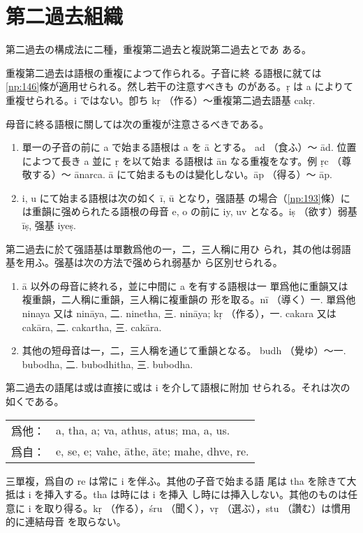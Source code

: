 \section{第二過去組織}
第二過去の構成法に二種，重複第二過去と複説第二過去とであ
ある。

\numberParagraph \label{np:192}
重複第二過去は語根の重複によつて作られる。子音に終
る語根に就ては \ref{np:146}條が適用せられる。然し若干の注意すべきも
のがある。ṛ は a によりて重複せられる。i ではない。卽ち kṛ
（作る）～重複第二過去語基 cakṛ.

母音に終る語根に關しては次の重複が注意さるべきである。
\begin{enumerate}[label=(\alph*)]
\item 單一の子音の前に a で始まる語根は a を ā とする。
ad （食ふ）～ ād. 位置によつて長き a 並に ṛ を以て始ま
る語根は ān なる重複をなす。例 ṛc （尊敬する）～ ānarca.
ā にて始まるものは變化しない。āp （得る）～ āp.
\item i, u にて始まる語根は次の如く ī, ū となり，强語基
の場合（\ref{np:193}條）には重韻に强められたる語根の母音 e, o
の前に iy, uv となる。iṣ （欲す）弱基 īṣ, 强基 iyeṣ.
\end{enumerate}

\numberParagraph \label{np:193}
第二過去に於て强語基は單數爲他の一，二，三人稱に用ひ
られ，其の他は弱語基を用ふ。强基は次の方法で强められ弱基か
ら区別せられる。
\begin{enumerate}[label=(\alph*)]
\item ā 以外の母音に終れる，並に中間に a を有する語根は一
單爲他に重韻又は複重韻，二人稱に重韻，三人稱に複重韻の
形を取る。nī （導く）一. 單爲他 ninaya 又は nināya, 二.
ninetha, 三. nināya; kṛ （作る），一. cakara 又は
cakāra, 二. cakartha, 三. cakāra.
\item 其他の短母音は一，二，三人稱を通じて重韻となる。
budh （覺ゆ）～一. bubodha, 二. bubodhitha, 三. bubodha.
\end{enumerate}

\numberParagraph \label{np:194}
第二過去の語尾は或は直接に或は i を介して語根に附加
せられる。それは次の如くである。

\begin{tabular}{ll}
  爲他： & a, tha, a; va, athus, atus; ma, a, us. \\
  爲自： & e, se, e; vahe, āthe, āte; mahe, dhve, re.
\end{tabular}

三單複，爲自の re は常に i を伴ふ。其他の子音で始まる語
尾は tha を除きて大抵は i を挿入する。tha は時には i を挿入
し時には挿入しない。其他のものは任意に i を取り得る。kṛ
（作る），śru （聞く），vṛ （選ぶ），stu （讚む）は慣用的に連結母音
を取らない。

